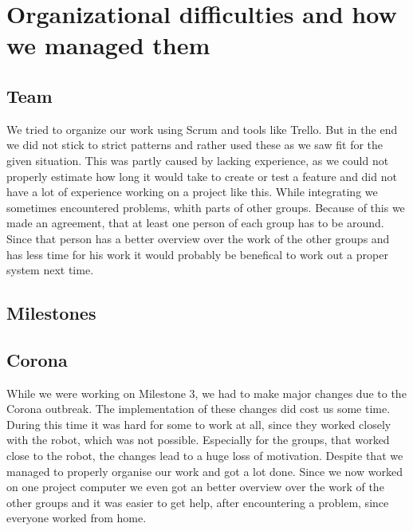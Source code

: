 \documentclass[main.tex]{subfiles}
\begin{document}
	\begingroup

	\renewcommand{\cleardoublepage}{}

	\renewcommand{\clearpage}{}

	\chapter{Organizational difficulties and how we managed them}

		
		\section{Team}
		We tried to organize our work using Scrum and tools like Trello. But in the end we did not stick to strict patterns and rather used these as we saw fit for the given situation. This was partly caused by lacking experience, as we could not properly estimate how long it would take to create or test a feature and did not have a lot of experience working on a project like this.
		While integrating we sometimes encountered problems, whith parts of other groups. Because of this we made an agreement, that at least one person of each group has to be around. Since that person has a better overview over the work of the other groups and has less time for his work it would probably be benefical to work out a proper system next time.
		
		
		\section{Milestones}
		
		\section{Corona}
	  	While we were working on Milestone 3, we had to make major changes due to the Corona outbreak. The implementation of these changes did cost us some time. During this time it was hard for some to work at all, since they worked closely with the robot, which was not possible.
	  	Especially for the groups, that worked close to the robot, the changes lead to a huge loss of motivation.
	  	Despite that we managed to properly organise our work and got a lot done.
	  	Since we now worked on one project computer we even got an better overview over the work of the other groups and it was easier to get help, after encountering a problem, since everyone worked from home.

	\endgroup
\end{document}
